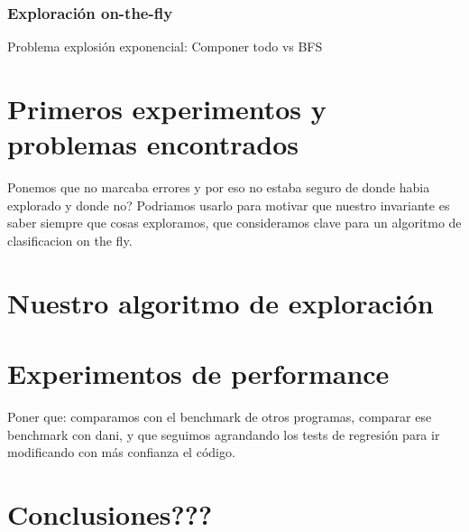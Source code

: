 \documentclass[11pt,a4paper,twoside]{tesis}
\begin{document}
\subsection{Exploración on-the-fly}
Problema explosión exponencial: Componer todo vs BFS
\\



\chapter{Primeros experimentos y problemas encontrados}
Ponemos que no marcaba errores y por eso no estaba seguro de donde habia explorado y donde no? Podriamos usarlo para motivar que nuestro invariante es saber siempre que cosas exploramos, que consideramos clave para un algoritmo de clasificacion on the fly.



\chapter{Nuestro algoritmo de exploración}




\chapter{Experimentos de performance}
Poner que: comparamos con el benchmark de otros programas, comparar ese benchmark con dani, y que seguimos agrandando los tests de regresión para ir modificando con más confianza el código.



\chapter{Conclusiones???}

\backmatter
%
\end{document}
